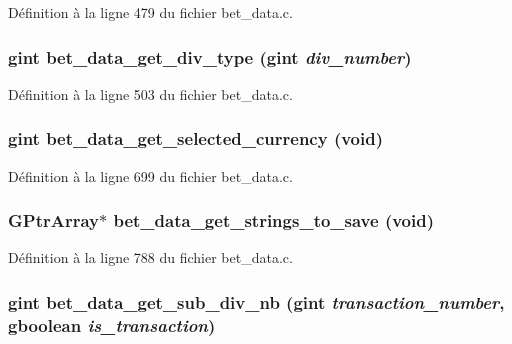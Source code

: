 Définition à la ligne 479 du fichier bet\_\-data.c.

\subsubsection[{bet\_\-data\_\-get\_\-div\_\-type}]{\setlength{\rightskip}{0pt plus 5cm}gint bet\_\-data\_\-get\_\-div\_\-type (gint {\em div\_\-number})}\label{bet__data_8c_ae1629f0fcd2e8027d1b9a07d99efbf1d}


Définition à la ligne 503 du fichier bet\_\-data.c.

\subsubsection[{bet\_\-data\_\-get\_\-selected\_\-currency}]{\setlength{\rightskip}{0pt plus 5cm}gint bet\_\-data\_\-get\_\-selected\_\-currency (void)}\label{bet__data_8c_a276706a60495ceea4d9b6ce0794888e9}


Définition à la ligne 699 du fichier bet\_\-data.c.

\subsubsection[{bet\_\-data\_\-get\_\-strings\_\-to\_\-save}]{\setlength{\rightskip}{0pt plus 5cm}GPtrArray$\ast$ bet\_\-data\_\-get\_\-strings\_\-to\_\-save (void)}\label{bet__data_8c_a4185b5667139f402a298806bb53a211a}


Définition à la ligne 788 du fichier bet\_\-data.c.

\subsubsection[{bet\_\-data\_\-get\_\-sub\_\-div\_\-nb}]{\setlength{\rightskip}{0pt plus 5cm}gint bet\_\-data\_\-get\_\-sub\_\-div\_\-nb (gint {\em transaction\_\-number}, \/  gboolean {\em is\_\-transaction})}\label{bet__data_8c_a92ceecac038add334e75ef1c12f7a666}


